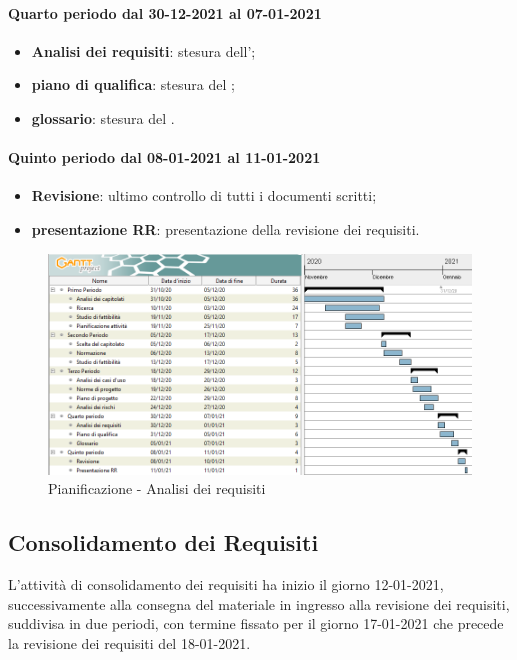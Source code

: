 \paragraph{Quarto periodo dal 30-12-2021 al 07-01-2021} 
\begin{itemize} 
	\item \textbf{Analisi dei requisiti}: stesura dell’; 
	\item \textbf{piano di qualifica}: stesura del ; 
	\item \textbf{glossario}: stesura del . 
\end{itemize} 

\paragraph{Quinto periodo dal 08-01-2021 al 11-01-2021} 
\begin{itemize} 
	\item \textbf{Revisione}: ultimo controllo di tutti i documenti scritti; 
	\item \textbf{presentazione RR}: presentazione della revisione dei requisiti. 
\end{itemize} 


\newpage 

\begin{landscape} 
	\begin{figure}[h!] 
		\includegraphics[width=24cm]{images/1_Analisi_dei_requisiti.png} 
		\caption{Pianificazione - Analisi dei requisiti} 
	\end{figure} 
\end{landscape} 

\newpage 

\subsection{Consolidamento dei Requisiti} 
L'attività di consolidamento dei requisiti ha inizio il giorno 12-01-2021, successivamente alla consegna del materiale in ingresso alla revisione dei requisiti, suddivisa in due periodi, con termine fissato 
per il giorno 17-01-2021 che precede la revisione dei requisiti del 18-01-2021. 

